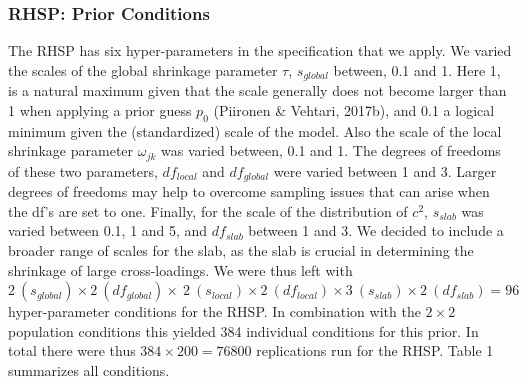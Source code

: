 \documentclass[
  man, donotrepeattitle,floatsintext]{apa6}
\begin{document}
\hypertarget{rhsp-prior-conditions}{%
\subsubsection{RHSP: Prior Conditions}\label{rhsp-prior-conditions}}

The RHSP has six hyper-parameters in the specification that we apply. We varied the scales of the global shrinkage parameter \(\tau\), \(s_{global}\) between, 0.1 and 1. Here 1, is a natural maximum given that the scale generally does not become larger than 1 when applying a prior guess \(p_0\) (Piironen \& Vehtari, 2017b), and 0.1 a logical minimum given the (standardized) scale of the model. Also the scale of the local shrinkage parameter \(\omega_{jk}\) was varied between, 0.1 and 1. The degrees of freedoms of these two parameters, \(df_{local}\) and \(df_{global}\) were varied between 1 and 3. Larger degrees of freedoms may help to overcome sampling issues that can arise when the df's are set to one. Finally, for the scale of the distribution of \(c^2\), \(s_{slab}\) was varied between 0.1, 1 and 5, and \(df_{slab}\) between 1 and 3. We decided to include a broader range of scales for the slab, as the slab is crucial in determining the shrinkage of large cross-loadings. We were thus left with \(2 \ (s_{global}) \times 2 \ (df_{global}) \times \ 2 \ (s_{local}) \times2 \ (df_{local}) \times 3 \ (s_{slab}) \times2 \ (df_{slab}) = 96\) hyper-parameter conditions for the RHSP. In combination with the \(2 \times 2\) population conditions this yielded 384 individual conditions for this prior. In total there were thus \(384 \times 200 = 76800\) replications run for the RHSP. Table 1 summarizes all conditions.
\end{document}
